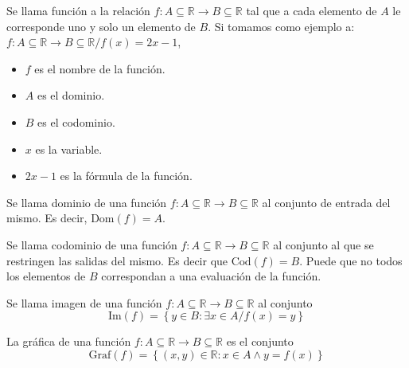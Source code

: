 \begin{definition}
    Se llama función a la relación $f: A \subseteq \mathbb{R} \rightarrow B \subseteq \mathbb{R}$ tal que a cada elemento de
    $A$ le corresponde uno y solo un elemento de $B$.
    Si tomamos como ejemplo a: $f: A \subseteq \mathbb{R} \rightarrow B \subseteq \mathbb{R} / f(x)=2x-1$,
    \begin{itemize}
        \item $f$ es el nombre de la función.
        \item $A$ es el dominio.
        \item $B$ es el codominio.
        \item $x$ es la variable.
        \item $2x-1$ es la fórmula de la función.
    \end{itemize}
\end{definition}
\begin{definition}
    Se llama dominio de una función \newline$f: A \subseteq \mathbb{R} \rightarrow B \subseteq \mathbb{R}$
    al conjunto de entrada del mismo. Es decir, $\text{Dom}(f)=A$.
\end{definition}
\begin{definition}
    Se llama codominio de una función \newline $f: A \subseteq \mathbb{R} \rightarrow B \subseteq \mathbb{R}$
    al conjunto al que se restringen las salidas del mismo. Es decir que $\text{Cod}(f)=B$.
    Puede que no todos los elementos de $B$ correspondan a una evaluación de la función.
\end{definition}
\begin{definition}
    Se llama imagen de una función \newline $f: A \subseteq \mathbb{R} \rightarrow B \subseteq \mathbb{R}$ 
    al conjunto 
    \begin{equation*}
        \text{Im}(f) = \left\{ y\in B: \exists x\in A / f(x)=y \right\}    
    \end{equation*}
\end{definition}
\begin{definition}
    La gráfica de una función $f: A \subseteq \mathbb{R} \rightarrow B \subseteq \mathbb{R}$ es
    el conjunto
    \begin{equation*}
        \text{Graf}(f) = \left\{ (x,y)\in \mathbb{R}: x \in A \land y=f(x)\right\}    
    \end{equation*}
\end{definition}
